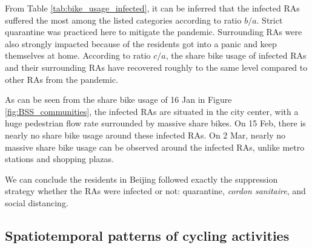 \documentclass[ijgi,submit,moreauthors,pdftex]{Definitions/mdpi}
\begin{document}
From Table \ref{tab:bike_usage_infected}, it can be inferred that the infected RAs suffered the most among the listed categories according to ratio $b/a$.
Strict quarantine was practiced here to mitigate the pandemic.
Surrounding RAs were also strongly impacted because of the residents got into a panic and keep themselves at home.
According to ratio $c/a$, the share bike usage of infected RAs and their surrounding RAs have recovered roughly to the same level compared to other RAs from the pandemic.

As can be seen from the share bike usage of 16 Jan in Figure \ref{fig:BSS_communities}, the infected RAs are situated in the city center, with a huge pedestrian flow rate surrounded by massive share bikes.
On 15 Feb, there is nearly no share bike usage around these infected RAs.
On 2 Mar, nearly no massive share bike usage can be observed around the infected RAs, unlike metro stations and shopping plazas.

We can conclude the residents in Beijing followed exactly the suppression strategy whether the RAs were infected or not: quarantine, \textit{cordon sanitaire}, and social distancing.

\subsection{Spatiotemporal patterns of cycling activities}
\end{document}
